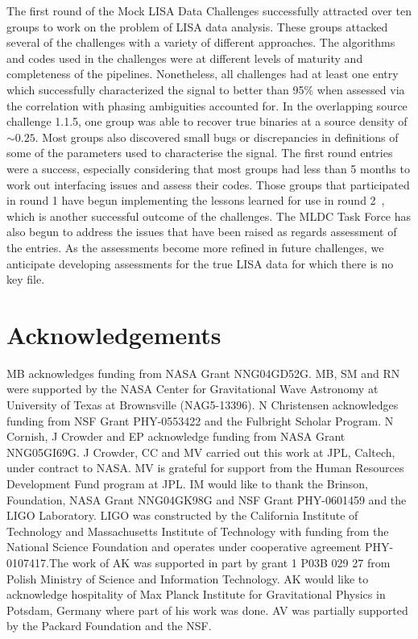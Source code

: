 \documentclass[12pt]{iopart}
\begin{document}
The first round of the Mock LISA Data Challenges successfully attracted over ten groups to work on the problem of LISA data analysis. These groups attacked several of the challenges with a variety of different approaches. The algorithms and codes used in the challenges were at different levels of maturity and completeness of the pipelines. Nonetheless, all challenges had at least one entry which successfully characterized the signal to better than 95\% when assessed via the correlation with phasing ambiguities accounted for. In the overlapping source challenge 1.1.5, one group was able to recover true binaries at a source density of $\sim 0.25$. Most groups also discovered small bugs or discrepancies in definitions of some of the parameters used to characterise the signal. The first round entries were a success, especially considering that most groups had less than 5 months to work out interfacing issues and assess their codes. Those groups that participated in round 1 have begun implementing the lessons learned for use in round 2~\cite{MLDC2doc}, which is another successful outcome of the challenges. The MLDC Task Force has also begun to address the issues that have been raised as regards assessment of the entries. As the assessments become more refined in future challenges, we anticipate developing assessments for the true LISA data for which there is no key file.

\section*{Acknowledgements}
MB acknowledges funding from NASA Grant NNG04GD52G. MB, SM and RN were supported by the NASA Center for Gravitational Wave Astronomy at University of Texas at Brownsville (NAG5-13396). N Christensen acknowledges funding from NSF Grant PHY-0553422 and the Fulbright Scholar Program. N Cornish, J Crowder and EP acknowledge funding from NASA Grant NNG05GI69G. J Crowder, CC and MV carried out this work at JPL, Caltech, under contract to NASA. MV is grateful for support from the Human Resources Development Fund program at JPL. IM would like to thank the Brinson, Foundation, NASA Grant NNG04GK98G and NSF Grant PHY-0601459 and the LIGO Laboratory. LIGO was constructed by the California Institute of Technology and Massachusetts Institute of Technology with funding from the National Science Foundation and operates under cooperative agreement PHY-0107417.The work of AK was supported in part by grant 1 P03B 029 27 from Polish Ministry of Science and Information Technology. AK would like to acknowledge hospitality of Max Planck Institute for Gravitational Physics in Potsdam, Germany where part of his work was done. AV was partially supported by the Packard Foundation and the NSF.
\end{document}
